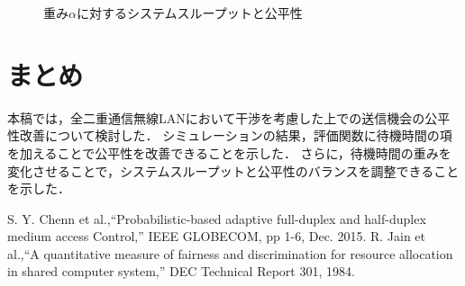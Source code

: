 \documentclass[twocolumn, a4paper]{ieicejsp}
\begin{document}
\begin{figure}[t]
	\centering
	\caption{重み$\alpha$に対するシステムスループットと公平性}
	\label{fig:thr_fair}
\end{figure}

\section{まとめ}
本稿では，全二重通信無線LANにおいて干渉を考慮した上での送信機会の公平性改善について検討した．
シミュレーションの結果，評価関数に待機時間の項を加えることで公平性を改善できることを示した．
さらに，待機時間の重みを変化させることで，システムスループットと公平性のバランスを調整できることを示した．


\small

\begin{thebibliography}{9}
 S. Y. Chenn et al.,``Probabilistic-based adaptive full-duplex and half-duplex medium access Control,'' IEEE GLOBECOM,  pp 1-6, Dec. 2015.
 R. Jain et al.,``A quantitative measure of fairness and discrimination for resource allocation in shared computer system,'' DEC Technical Report 301, 1984.
\end{thebibliography}
\end{document}
